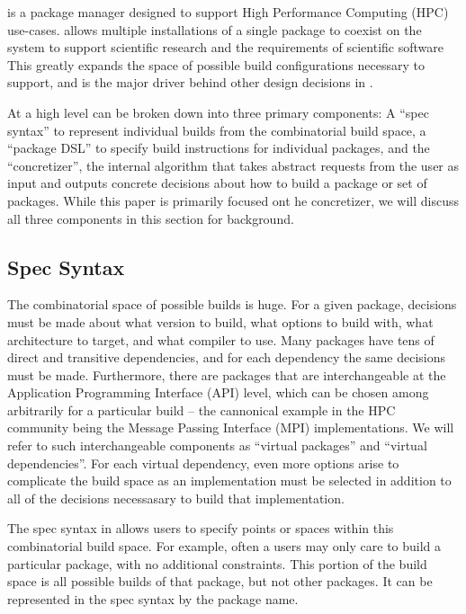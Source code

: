 \spack is a package manager designed to support High Performance Computing (HPC) use-cases.
\spack allows multiple installations of a single package to coexist on the system to support scientific research and the requirements of scientific software
This greatly expands the space of possible build configurations necessary to support, and is the major driver behind other design decisions in \spack.

At a high level \spack can be broken down into three primary components: A ``spec syntax'' to represent individual builds from the combinatorial build space, a ``package DSL'' to specify build instructions for individual packages, and the ``concretizer'', the internal algorithm that takes abstract requests from the user as input and outputs concrete decisions about how to build a package or set of packages.
While this paper is primarily focused ont he concretizer, we will discuss all three components in this section for background.

\subsection{Spec Syntax}

The combinatorial space of possible \spack builds is huge.
For a given package, decisions must be made about what version to build, what options to build with, what architecture to target, and what compiler to use.
Many packages have tens of direct and transitive dependencies, and for each dependency the same decisions must be made.
Furthermore, there are packages that are interchangeable at the Application Programming Interface (API) level, which can be chosen among arbitrarily for a particular build -- the cannonical example in the HPC community being the Message Passing Interface (MPI) implementations.
We will refer to such interchangeable components as ``virtual packages'' and ``virtual dependencies''.
For each virtual dependency, even more options arise to complicate the build space as an implementation must be selected in addition to all of the decisions necessasary to build that implementation.

The spec syntax in \spack allows users to specify points or spaces within this combinatorial build space.
For example, often a users may only care to build a particular package, with no additional constraints.
This portion of the build space is all possible builds of that package, but not other packages.
It can be represented in the spec syntax by the package name.

